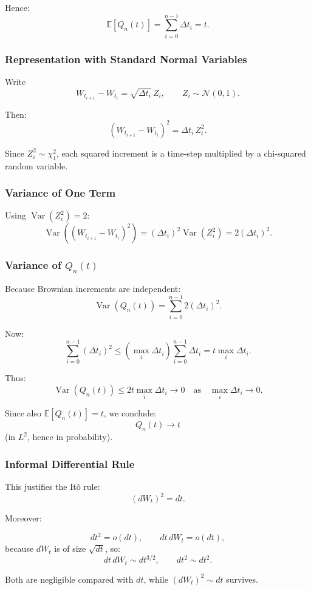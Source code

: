 \documentclass[11pt]{article}
\begin{document}
Hence:
\[
\mathbb E[Q_n(t)]
=
\sum_{i=0}^{n-1}\Delta t_i=t.
\]

\subsubsection*{Representation with Standard Normal Variables}

Write
\[
W_{t_{i+1}}-W_{t_i}=\sqrt{\Delta t_i}\,Z_i,
\qquad Z_i\sim\mathcal N(0,1).
\]

Then:
\[
(W_{t_{i+1}}-W_{t_i})^2=\Delta t_i\, Z_i^2.
\]

Since $Z_i^2\sim\chi^2_1$, each squared increment is a time-step multiplied by a chi-squared random variable.

\subsubsection*{Variance of One Term}

Using $\operatorname{Var}(Z_i^2)=2$:
\[
\operatorname{Var}\!\left((W_{t_{i+1}}-W_{t_i})^2\right)
=
(\Delta t_i)^2\operatorname{Var}(Z_i^2)
=
2(\Delta t_i)^2.
\]

\subsubsection*{Variance of $Q_n(t)$}

Because Brownian increments are independent:
\[
\operatorname{Var}(Q_n(t))
=
\sum_{i=0}^{n-1}2(\Delta t_i)^2.
\]

Now:
\[
\sum_{i=0}^{n-1}(\Delta t_i)^2
\le
\left(\max_i \Delta t_i\right)\sum_{i=0}^{n-1}\Delta t_i
=
t\max_i\Delta t_i.
\]

Thus:
\[
\operatorname{Var}(Q_n(t))
\le
2t\max_i\Delta t_i \to 0
\quad\text{as}\quad \max_i\Delta t_i\to0.
\]

Since also $\mathbb E[Q_n(t)]=t$, we conclude:
\[
Q_n(t)\to t
\]
(in $L^2$, hence in probability).

\subsubsection*{Informal Differential Rule}

This justifies the It\^o rule:
\[
(dW_t)^2=dt.
\]

Moreover:

\[
dt^2=o(dt),\qquad dt\,dW_t=o(dt),
\]
because $dW_t$ is of size $\sqrt{dt}$, so:
\[
dt\,dW_t\sim dt^{3/2},\qquad dt^2\sim dt^2.
\]

Both are negligible compared with $dt$, while $(dW_t)^2\sim dt$ survives.
\end{document}
